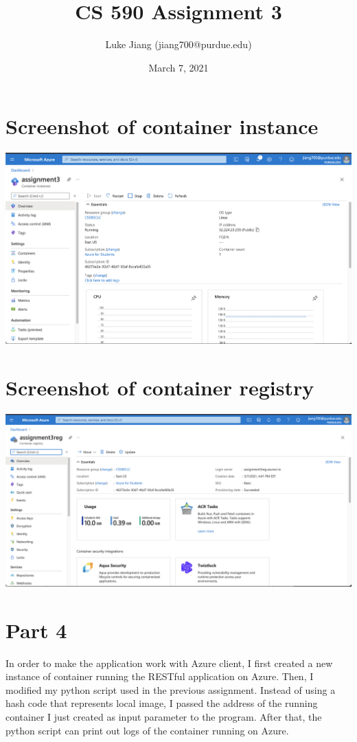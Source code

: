\documentclass{article}
\title{CS 590 Assignment 3}
\author{Luke Jiang (jiang700@purdue.edu) }
\date{March 7, 2021}
\begin{document}
\maketitle

\section{Screenshot of container instance}
\includegraphics[scale=0.35]{ass3-2.png}

\section{Screenshot of container registry}
\includegraphics[scale=0.3]{ass3-3.png}

\section{Part 4}
In order to make the application work with Azure client, I first created a new instance of container running the RESTful application on Azure. Then, I modified my python script used in the previous assignment. Instead of using a hash code that represents local image, I passed the address of the running container I just created as input parameter to the program. After that, the python script can print out logs of the container running on Azure. 
\end{document}
